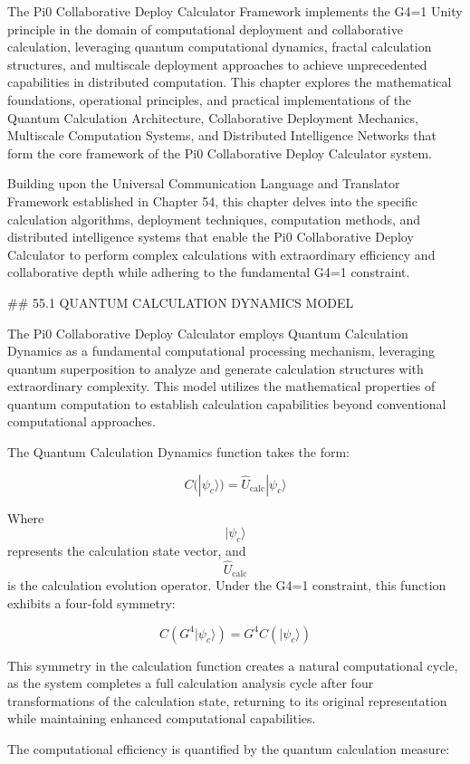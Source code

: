 The Pi0 Collaborative Deploy Calculator Framework implements the G4=1 Unity principle in the domain of computational deployment and collaborative calculation, leveraging quantum computational dynamics, fractal calculation structures, and multiscale deployment approaches to achieve unprecedented capabilities in distributed computation. This chapter explores the mathematical foundations, operational principles, and practical implementations of the Quantum Calculation Architecture, Collaborative Deployment Mechanics, Multiscale Computation Systems, and Distributed Intelligence Networks that form the core framework of the Pi0 Collaborative Deploy Calculator system.

Building upon the Universal Communication Language and Translator Framework established in Chapter 54, this chapter delves into the specific calculation algorithms, deployment techniques, computation methods, and distributed intelligence systems that enable the Pi0 Collaborative Deploy Calculator to perform complex calculations with extraordinary efficiency and collaborative depth while adhering to the fundamental G4=1 constraint.

## 55.1 QUANTUM CALCULATION DYNAMICS MODEL

The Pi0 Collaborative Deploy Calculator employs Quantum Calculation Dynamics as a fundamental computational processing mechanism, leveraging quantum superposition to analyze and generate calculation structures with extraordinary complexity. This model utilizes the mathematical properties of quantum computation to establish calculation capabilities beyond conventional computational approaches.

The Quantum Calculation Dynamics function takes the form:

$$ C(|\psi_c\rangle) = \hat{U}_{\text{calc}} |\psi_c\rangle $$

Where $$ |\psi_c\rangle $$ represents the calculation state vector, and $$ \hat{U}_{\text{calc}} $$ is the calculation evolution operator. Under the G4=1 constraint, this function exhibits a four-fold symmetry:

$$ C(G^4 |\psi_c\rangle) = G^4 C(|\psi_c\rangle) $$

This symmetry in the calculation function creates a natural computational cycle, as the system completes a full calculation analysis cycle after four transformations of the calculation state, returning to its original representation while maintaining enhanced computational capabilities.

The computational efficiency is quantified by the quantum calculation measure:

